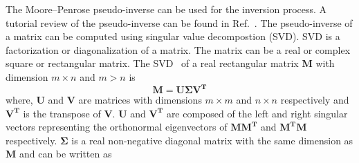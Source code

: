 The Moore--Penrose pseudo-inverse can be used for the inversion process. A tutorial review of the pseudo-inverse can be found in Ref.~\cite{pseudo}. The pseudo-inverse of a matrix can be computed using singular value decompostion (SVD). SVD is a factorization or diagonalization of a matrix. The matrix can be a real or complex square or rectangular matrix. The SVD~\cite{svd4,svd2,svd3} of a real rectangular matrix $\bm{M}$ with dimension $m \times n$ and $m>n$ is 
\begin{equation}\label{eq:m}
    \bm{M} = \bm{U} \bm{\Sigma} \bm{V^T}
\end{equation}
where, $\bm{U}$ and $\bm{V}$ are matrices with dimensions $m \times m$ and $n \times n$ respectively and $\bm{V^T}$ is the transpose of $\bm{V}$. $\bm{U}$ and $\bm{V^T}$ are composed of the left and right singular vectors representing the orthonormal eigenvectors of $\bm{M}\bm{M^T}$ and $\bm{M^T}\bm{M}$ respectively. $\bm{\Sigma}$ is a real non-negative diagonal matrix with the same dimension as  $\bm{M}$ and can be written as

